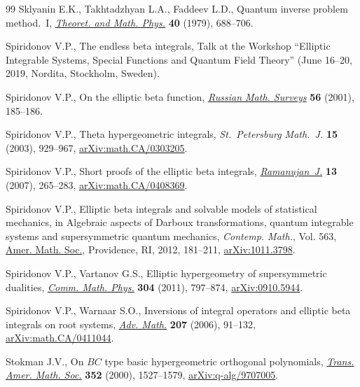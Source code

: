 \documentclass[pdftex]{sigma}
\numberwithin{equation}{section}
\begin{document}
\begin{thebibliography}{99}
Sklyanin E.K., Takhtadzhyan L.A., Faddeev L.D., Quantum inverse problem
 method.~{I}, \href{http://dx.doi.org/10.1007/BF01018718}{\textit{Theoret. and Math. Phys.}} \textbf{40} (1979), 688--706.

Spiridonov V.P., The endless beta integrals, {T}alk at the Workshop ``Elliptic
 Integrable Systems, Special Functions and Quantum Field Theory'' (June
 16--20, 2019, Nordita, Stockholm, Sweden).

Spiridonov V.P., On the elliptic beta function, \href{https://doi.org/10.1070/rm2001v056n01ABEH000374}{\textit{Russian Math. Surveys}}
 \textbf{56} (2001), 185--186.

Spiridonov V.P., Theta hypergeometric integrals, \textit{St.~Petersburg
 Math.~J.} \textbf{15} (2003), 929--967, \href{https://arxiv.org/abs/math.CA/0303205}{arXiv:math.CA/0303205}.

Spiridonov V.P., Short proofs of the elliptic beta integrals,
 \href{https://doi.org/10.1007/s11139-006-0252-2}{\textit{Ramanujan~J.}} \textbf{13} (2007), 265--283, \href{https://arxiv.org/abs/math.CA/0408369}{arXiv:math.CA/0408369}.

Spiridonov V.P., Elliptic beta integrals and solvable models of statistical
 mechanics, in Algebraic aspects of {D}arboux transformations, quantum
 integrable systems and supersymmetric quantum mechanics, \textit{Contemp.
 Math.}, Vol. 563, \href{https://doi.org/10.1090/conm/563/11170}{Amer. Math. Soc.}, Providence, RI, 2012, 181--211,
 \href{https://arxiv.org/abs/1011.3798}{arXiv:1011.3798}.

Spiridonov V.P., Vartanov G.S., Elliptic hypergeometry of supersymmetric
 dualities, \href{https://doi.org/10.1007/s00220-011-1218-9}{\textit{Comm. Math. Phys.}} \textbf{304} (2011), 797--874,
 \href{https://arxiv.org/abs/0910.5944}{arXiv:0910.5944}.

Spiridonov V.P., Warnaar S.O., Inversions of integral operators and elliptic
 beta integrals on root systems, \href{https://doi.org/10.1016/j.aim.2005.11.007}{\textit{Adv. Math.}} \textbf{207} (2006),
 91--132, \href{https://arxiv.org/abs/math.CA/0411044}{arXiv:math.CA/0411044}.

Stokman J.V., On {$BC$} type basic hypergeometric orthogonal polynomials,
 \href{https://doi.org/10.1090/S0002-9947-99-02551-9}{\textit{Trans. Amer. Math. Soc.}} \textbf{352} (2000), 1527--1579,
 \href{https://arxiv.org/abs/q-alg/9707005}{arXiv:q-alg/9707005}.

\end{thebibliography}\LastPageEnding
\end{document}

